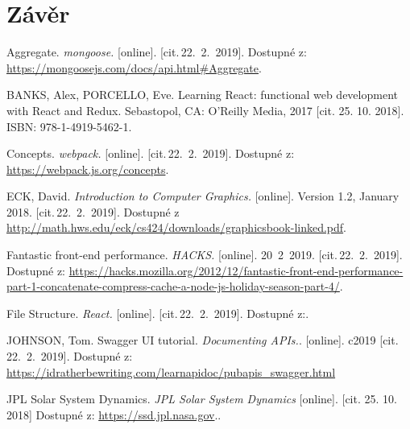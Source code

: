\documentclass[a4paper,12pt]{article}
\begin{document}
\section*{Závěr}



\clearpage {} {}

\begin{thebibliography}{99}	%


Aggregate.
\textit{mongoose.} [online]. [cit.\,22.~2.~2019].
Dostupné z: {\ttfamily \url{https://mongoosejs.com/docs/api.html#Aggregate}}.

BANKS, Alex, PORCELLO, Eve. Learning React: functional web development with React and Redux. Sebastopol, CA: O'Reilly Media, 2017 [cit. 25. 10. 2018]. ISBN: 978-1-4919-5462-1.

Concepts.
\textit{webpack.} [online]. [cit.\,22.~2.~2019].
Dostupné z: {\ttfamily \url{https://webpack.js.org/concepts}}.

ECK, David. \textit{Introduction to Computer Graphics.} [online]. Version 1.2, January 2018. [cit.\,22.~2.~2019]. Dostupné z \url{http://math.hws.edu/eck/cs424/downloads/graphicsbook-linked.pdf}.

Fantastic front-end performance.
\textit{HACKS.} [online]. 20~2~2019. [cit.\,22.~2.~2019].
Dostupné z: {\ttfamily \url{https://hacks.mozilla.org/2012/12/fantastic-front-end-performance-part-1-concatenate-compress-cache-a-node-js-holiday-season-part-4/}}.

File Structure.
\textit{React.} [online]. [cit.\,22.~2.~2019].
Dostupné z:.

JOHNSON, Tom. Swagger UI tutorial. \textit{Documenting APIs.}. [online]. c2019 [cit.\,22.~2.~2019]. Dostupné z: {\ttfamily \url{https://idratherbewriting.com/learnapidoc/pubapis_swagger.html}}

JPL Solar System Dynamics. \textit{JPL Solar System Dynamics} [online]. [cit. 25. 10. 2018] Dostupné z: \url{https://ssd.jpl.nasa.gov}..


\end{thebibliography}
\end{document}
